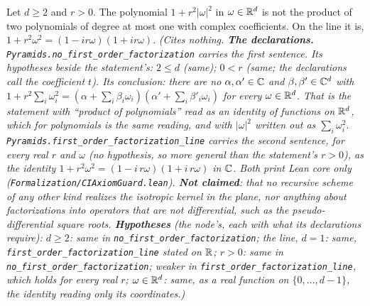 \begin{lemma}
\label{lem:no-first-order-factorization}
\leanok
Let $d \ge 2$ and $r > 0$. The polynomial $1 + r^2|\omega|^2$ in $\omega \in \mathbb{R}^d$ is not the
product of two polynomials of degree at most one with complex coefficients. On the line it is,
$1 + r^2\omega^2 = (1 - ir\omega)(1 + ir\omega)$.
\statusT\quad\emph{(Cites nothing. \textbf{The declarations.}
\texttt{Pyramids.no\_first\_order\_factorization} carries the first sentence. Its hypotheses beside
the statement's: $2 \le d$ (same); $0 < r$ (same; the declarations call the coefficient $t$). Its
conclusion: there are no
$\alpha, \alpha' \in \mathbb{C}$ and $\beta, \beta' \in \mathbb{C}^d$ with
$1 + r^2\sum_i\omega_i^2 = (\alpha + \sum_i\beta_i\omega_i)(\alpha' + \sum_i\beta'_i\omega_i)$ for every
$\omega \in \mathbb{R}^d$. That is the statement with ``product of polynomials'' read as an identity of
functions on $\mathbb{R}^d$, which for polynomials is the same reading, and with $|\omega|^2$ written out
as $\sum_i\omega_i^2$. \texttt{Pyramids.first\_order\_factorization\_line} carries the second
sentence, for every real $r$ and $\omega$ (no hypothesis, so more general than the statement's
$r > 0$), as the identity $1 + r^2\omega^2 = (1 - i\,r\omega)(1 + i\,r\omega)$ in $\mathbb{C}$. Both print
Lean core only (\texttt{Formalization/CIAxiomGuard.lean}). \textbf{Not claimed}: that no recursive
scheme of any other kind realizes the isotropic \Matern{} kernel in the plane, nor anything about
factorizations into operators that are not differential, such as the pseudo-differential square
roots. \textbf{Hypotheses} (the node's, each with what its declarations require): $d \ge 2$: same in
\texttt{no\_first\_order\_factorization}; the line, $d = 1$: same, \texttt{first\_order\_factorization\_line}
stated on $\mathbb{R}$; $r > 0$: same in \texttt{no\_first\_order\_factorization}; weaker in
\texttt{first\_order\_factorization\_line}, which holds for every real $r$; $\omega \in \mathbb{R}^d$: same,
as a real function on $\{0, \dots, d - 1\}$, the identity reading only its coordinates.)}
\end{lemma}

